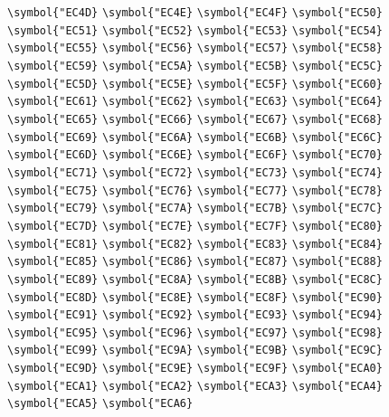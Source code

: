 \documentclass{ctexbook}
\begin{document}
{\verb|\symbol{"EC4D}|  \verb|\symbol{"EC4E}|  \verb|\symbol{"EC4F}|  \verb|\symbol{"EC50}|  \verb|\symbol{"EC51}|  \verb|\symbol{"EC52}|  \verb|\symbol{"EC53}|  \verb|\symbol{"EC54}|  \verb|\symbol{"EC55}|  \verb|\symbol{"EC56}|  \verb|\symbol{"EC57}|  \verb|\symbol{"EC58}|  \verb|\symbol{"EC59}|  \verb|\symbol{"EC5A}|  \verb|\symbol{"EC5B}|  \verb|\symbol{"EC5C}|  \verb|\symbol{"EC5D}|  \verb|\symbol{"EC5E}|  \verb|\symbol{"EC5F}|  \verb|\symbol{"EC60}|  \verb|\symbol{"EC61}|  \verb|\symbol{"EC62}|  \verb|\symbol{"EC63}|  \verb|\symbol{"EC64}|  \verb|\symbol{"EC65}|  \verb|\symbol{"EC66}|  \verb|\symbol{"EC67}|  \verb|\symbol{"EC68}|  \verb|\symbol{"EC69}|  \verb|\symbol{"EC6A}|  \verb|\symbol{"EC6B}|  \verb|\symbol{"EC6C}|  \verb|\symbol{"EC6D}|  \verb|\symbol{"EC6E}|  \verb|\symbol{"EC6F}|  \verb|\symbol{"EC70}|  \verb|\symbol{"EC71}|  \verb|\symbol{"EC72}|  \verb|\symbol{"EC73}|  \verb|\symbol{"EC74}|  \verb|\symbol{"EC75}|  \verb|\symbol{"EC76}|  \verb|\symbol{"EC77}|  \verb|\symbol{"EC78}|  \verb|\symbol{"EC79}|  \verb|\symbol{"EC7A}|  \verb|\symbol{"EC7B}|  \verb|\symbol{"EC7C}|  \verb|\symbol{"EC7D}|  \verb|\symbol{"EC7E}|  \verb|\symbol{"EC7F}|  \verb|\symbol{"EC80}|  \verb|\symbol{"EC81}|  \verb|\symbol{"EC82}|  \verb|\symbol{"EC83}|  \verb|\symbol{"EC84}|  \verb|\symbol{"EC85}|  \verb|\symbol{"EC86}|  \verb|\symbol{"EC87}|  \verb|\symbol{"EC88}|  \verb|\symbol{"EC89}|  \verb|\symbol{"EC8A}|  \verb|\symbol{"EC8B}|  \verb|\symbol{"EC8C}|  \verb|\symbol{"EC8D}|  \verb|\symbol{"EC8E}|  \verb|\symbol{"EC8F}|  \verb|\symbol{"EC90}|  \verb|\symbol{"EC91}|  \verb|\symbol{"EC92}|  \verb|\symbol{"EC93}|  \verb|\symbol{"EC94}|  \verb|\symbol{"EC95}|  \verb|\symbol{"EC96}|  \verb|\symbol{"EC97}|  \verb|\symbol{"EC98}|  \verb|\symbol{"EC99}|  \verb|\symbol{"EC9A}|  \verb|\symbol{"EC9B}|  \verb|\symbol{"EC9C}|  \verb|\symbol{"EC9D}|  \verb|\symbol{"EC9E}|  \verb|\symbol{"EC9F}|  \verb|\symbol{"ECA0}|  \verb|\symbol{"ECA1}|  \verb|\symbol{"ECA2}|  \verb|\symbol{"ECA3}|  \verb|\symbol{"ECA4}|  \verb|\symbol{"ECA5}|  \verb|\symbol{"ECA6}|  }
\end{document}
